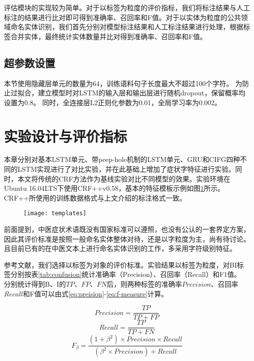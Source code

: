 评估模块的实现较为简单。对于以标签为粒度的评价指标，我们将标注结果与人工标注的结果进行比对即可得到准确率、召回率和F值。对于以实体为粒度的公共领域命名实体识别，我们首先分别对模型标注结果和人工标注结果进行处理，根据标签合并实体，最终统计实体数量并比对得到准确率、召回率和F值。

\subsection{超参数设置}
本节使用隐藏层单元的数量为64，训练语料句子长度最大不超过100个字符。
为防止过拟合，建立模型时对LSTM的输入层和输出层进行随机dropout，保留概率均设置为0.8。
同时，全连接层L2正则化参数为0.01，全局学习率为0.002。

\section{实验设计与评价指标}
\label{sec:tcm-pfr}
本章分别对基本LSTM单元、带peep-hole机制的LSTM单元、GRU和CIFG四种不同的LSTM实现进行了对比实验，并在此基础上增加了症状字特征进行实验。同时，本文将传统的CRF方法作为基线实验对比不同模型的效果。实验环境在Ubuntu 16.04LTS下使用CRF++v0.58，基本的特征模板示例如图\ref{fig:template}所示。CRF++所使用的训练数据格式与上文介绍的标注格式一致。
\begin{figure}[H]
    \centering
    \texttt{[image: templates]}
    \label{fig:template}
\end{figure}
前面提到，中医症状术语既没有国家标准可以遵照，也没有公认的一套界定方案，因此其评价标准是按照一般命名实体整体对待，还是以字粒度为主，尚有待讨论。
且目前已有的在中医文本上进行命名实体识别的工作，多采用字符级别特征。

参考文献，我们选择以标签为对象的评价标准。实验结果以标签为粒度，对BI标签分别按表\ref{tab:confusion}统计准确率（Precision）、召回率（Recall）和F1值。
分别统计得到B、I的$TP$、$FP$、$FN$后，则两种标签的准确率$Precision$、召回率$Recall$和F值可以由式\ref{eq:preision}-\ref{eq:f-measure}计算。

\begin{equation}
    Precision = \frac{TP}{TP+FP} \label{eq:preision}
\end{equation}
\begin{equation}
    Recall = \frac{TP}{TP+FN}
\end{equation}
\begin{equation}
    F_\beta = \frac{(1 + \beta^2)\times Precision \times Recall}{(\beta^2\times Precision) + Recall}\label{eq:f-measure}
\end{equation}

